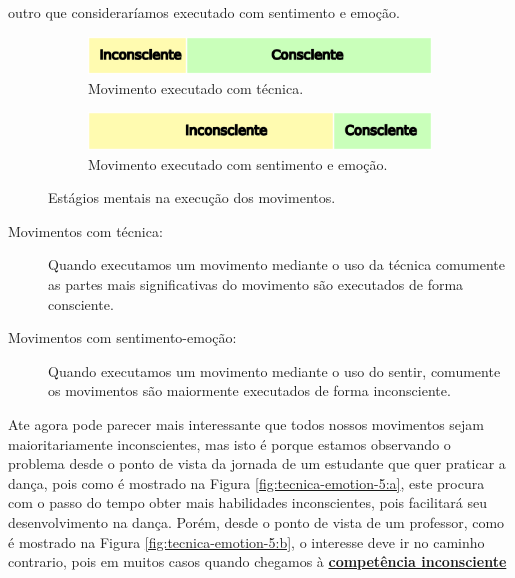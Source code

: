 outro que consideraríamos executado com sentimento e emoção.
\begin{figure}[ht]
\centering
    \begin{subfigure}[t]{.48\textwidth}
      \centering
      \includegraphics[width=.975\linewidth]{chapters/cap-musicalidade-tecnica/tecnica-emotion-4a}  
      \caption{Movimento executado com técnica.}
      \label{fig:tecnica-emotion-4:a}
    \end{subfigure}
    \hfill
    \begin{subfigure}[t]{.48\textwidth}
      \centering
      \includegraphics[width=.975\linewidth]{chapters/cap-musicalidade-tecnica/tecnica-emotion-4b}  
      \caption{Movimento executado com sentimento e emoção.}
      \label{fig:tecnica-emotion-4:b}
    \end{subfigure}
    \caption{Estágios mentais na execução dos movimentos.}
    \label{fig:tecnica-emotion-4}
\end{figure}
\begin{description}
\item [Movimentos com técnica:] Quando executamos um movimento mediante o uso da técnica 
comumente as partes mais significativas do movimento são executados de forma consciente.
\item [Movimentos com sentimento-emoção:] Quando executamos um movimento mediante o uso do sentir, 
comumente os movimentos são maiormente executados de forma inconsciente.
\end{description}
Ate agora pode parecer mais interessante que todos nossos movimentos sejam maioritariamente inconscientes,
mas isto é porque estamos observando o problema desde o ponto de vista da jornada de um estudante
que quer praticar a dança, pois como é mostrado na Figura \ref{fig:tecnica-emotion-5:a},
este procura com o passo do tempo obter mais habilidades inconscientes,
pois facilitará seu desenvolvimento na dança.
Porém, desde o ponto de vista de um professor,
como é mostrado na Figura \ref{fig:tecnica-emotion-5:b}, 
o interesse deve ir no caminho contrario,
pois em muitos casos quando chegamos à \hyperref[ref:CompetenciaInconsciente]{\textbf{competência inconsciente}}
